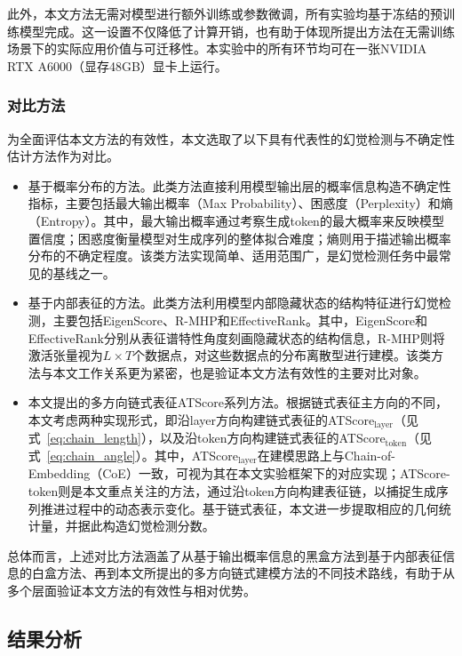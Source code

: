 此外，本文方法无需对模型进行额外训练或参数微调，所有实验均基于冻结的预训练模型完成。这一设置不仅降低了计算开销，也有助于体现所提出方法在无需训练场景下的实际应用价值与可迁移性。本实验中的所有环节均可在一张NVIDIA RTX A6000（显存48GB）显卡上运行。

\subsubsection{对比方法}

为全面评估本文方法的有效性，本文选取了以下具有代表性的幻觉检测与不确定性估计方法作为对比。

\begin{itemize}
  \item 基于概率分布的方法。此类方法直接利用模型输出层的概率信息构造不确定性指标，主要包括最大输出概率（Max Probability）、困惑度（Perplexity）和熵（Entropy）。其中，最大输出概率通过考察生成token的最大概率来反映模型置信度；困惑度衡量模型对生成序列的整体拟合难度；熵则用于描述输出概率分布的不确定程度。该类方法实现简单、适用范围广，是幻觉检测任务中最常见的基线之一。
  \item 基于内部表征的方法。此类方法利用模型内部隐藏状态的结构特征进行幻觉检测，主要包括EigenScore\cite{chen2024inside}、R-MHP\cite{liu2021learning}和EffectiveRank\cite{wang2025revisiting}。其中，EigenScore和EffectiveRank分别从表征谱特性角度刻画隐藏状态的结构信息，R-MHP则将激活张量视为$L\times T$个数据点，对这些数据点的分布离散型进行建模。该类方法与本文工作关系更为紧密，也是验证本文方法有效性的主要对比对象。
  \item 本文提出的多方向链式表征ATScore系列方法。根据链式表征主方向的不同，本文考虑两种实现形式，即沿layer方向构建链式表征的ATScore$_{\mathrm{layer}}$（见式~\ref{eq:chain_length}），以及沿token方向构建链式表征的ATScore$_{\mathrm{token}}$（见式~\ref{eq:chain_angle}）。其中，ATScore$_{\mathrm{layer}}$在建模思路上与Chain-of-Embedding（CoE）\cite{wang2025latent}一致，可视为其在本文实验框架下的对应实现；ATScore-token则是本文重点关注的方法，通过沿token方向构建表征链，以捕捉生成序列推进过程中的动态表示变化。基于链式表征，本文进一步提取相应的几何统计量，并据此构造幻觉检测分数。
\end{itemize}

总体而言，上述对比方法涵盖了从基于输出概率信息的黑盒方法到基于内部表征信息的白盒方法、再到本文所提出的多方向链式建模方法的不同技术路线，有助于从多个层面验证本文方法的有效性与相对优势。

\subsection{结果分析}\label{subsec:result_analysis}

